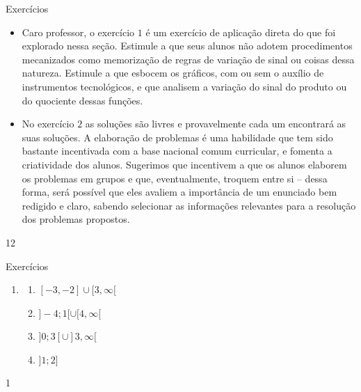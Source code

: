 \def\currentcolor{cor1}
\clearmargin\clearmargin
\begin{sugestions}{Exercícios}
{
\begin{itemize}
\item Caro professor, o exercício $1$ é um exercício de aplicação direta do que foi explorado nessa seção. Estimule a que seus alunos não adotem procedimentos mecanizados como memorização de regras de variação de sinal ou coisas dessa natureza. Estimule a que esbocem os gráficos, com ou sem o auxílio de instrumentos tecnológicos, e que analisem a variação do sinal do produto ou do quociente dessas funções.
\item  No exercício $2$ as soluções são livres e provavelmente cada um encontrará as suas soluções. A elaboração de problemas é uma habilidade que tem sido bastante incentivada com a base nacional comum curricular, e fomenta a criatividade dos alunos. Sugerimos que incentivem a que os alunos elaborem os problemas em grupos e que, eventualmente, troquem entre si – dessa forma, será possível que eles avaliem a importância de um enunciado bem redigido e claro, sabendo selecionar as informações relevantes para a resolução dos problemas propostos.
\end{itemize}
}{1}{2}
\end{sugestions}
\begin{answer}{Exercícios}
{\exerciselist
\begin{enumerate}
\item 
\begin{enumerate}
\item $[-3,-2]\cup [3,\infty [$
\item $]-4;1[\cup [4, \infty[$
\item $ ]0;3[ \cup ]3, \infty[$
\item $ ]1;2]$
\end{enumerate}
\end{enumerate}
}{1}
\end{answer}
\def\currentcolor{session4}

